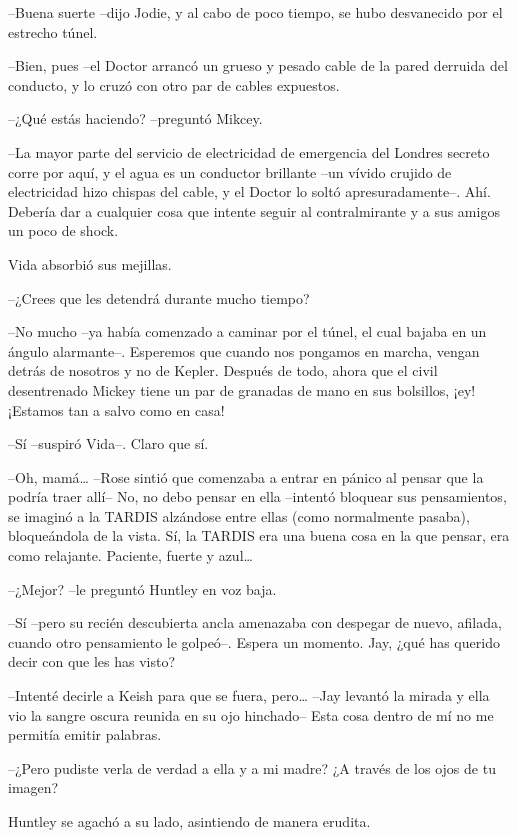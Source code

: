 {--Buena suerte --dijo Jodie, y al cabo de poco tiempo, se hubo
desvanecido por el estrecho túnel.}

{--Bien, pues --el Doctor arrancó un grueso y pesado cable de la pared
derruida del conducto, y lo cruzó con otro par de cables expuestos.}

{--¿Qué estás haciendo? --preguntó Mikcey.}

{--La mayor parte del servicio de electricidad de emergencia del Londres
 secreto corre por aquí, y el agua es un conductor brillante --un vívido
 crujido de electricidad hizo chispas del cable, y el Doctor lo soltó
 apresuradamente--. Ahí. Debería dar a cualquier cosa que intente seguir
al contralmirante y a sus amigos un poco de shock.}

{Vida absorbió sus mejillas.}

{--¿Crees que les detendrá durante mucho tiempo?}

{--No mucho --ya había comenzado a caminar por el túnel, el cual bajaba
 en un ángulo alarmante--. Esperemos que cuando nos pongamos en marcha,
 vengan detrás de nosotros y no de Kepler. Después de todo, ahora que el
 civil desentrenado Mickey tiene un par de granadas de mano en sus
bolsillos, ¡ey! ¡Estamos tan a salvo como en casa!}

{--Sí --suspiró Vida--. Claro que sí.}

\mbox{}

{--Oh, mamá\ldots{} --Rose sintió que comenzaba a entrar en pánico al
 pensar que la podría traer allí-- No, no debo pensar en ella --intentó
 bloquear sus pensamientos, se imaginó a la TARDIS alzándose entre ellas
 (como normalmente pasaba), bloqueándola de la vista. Sí, la TARDIS era
 una buena cosa en la que pensar, era como relajante. Paciente, fuerte y
 azul\ldots{}}

{--¿Mejor? --le preguntó Huntley en voz baja.}

{--Sí --pero su recién descubierta ancla amenazaba con despegar de
 nuevo, afilada, cuando otro pensamiento le golpeó--. Espera un momento.
Jay, ¿qué has querido decir con que les has visto?}

{--Intenté decirle a Keish para que se fuera, pero\ldots{} --Jay levantó
 la mirada y ella vio la sangre oscura reunida en su ojo hinchado-- Esta
cosa dentro de mí no me permitía emitir palabras.}

{--¿Pero pudiste verla de verdad a ella y a mi madre? ¿A través de los
ojos de tu imagen?}

{Huntley se agachó a su lado, asintiendo de manera erudita.}

